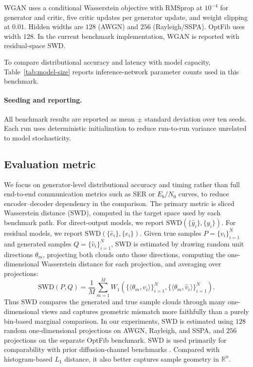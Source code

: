 \documentclass[conference]{IEEEtran}
\begin{document}
WGAN uses a conditional Wasserstein objective with RMSprop at \(10^{-4}\) for generator and critic, five critic updates per generator update, and weight clipping at \(0.01\). Hidden widths are \(128\) (AWGN) and \(256\) (Rayleigh/SSPA). OptFib uses width \(128\). In the current benchmark implementation, WGAN is reported with residual-space SWD.

To compare distributional accuracy and latency with model capacity, Table~\ref{tab:model-size} reports inference-network parameter counts used in this benchmark.


\paragraph{Seeding and reporting.}
  All benchmark results are reported as mean \(\pm\) standard deviation over ten seeds.
  Each run uses deterministic initialization to reduce run-to-run variance unrelated to model
  stochasticity.

\subsection{Evaluation metric}
We focus on generator-level distributional accuracy and timing rather than full end-to-end communication metrics such as SER or \(E_b/N_0\) curves, to reduce encoder--decoder dependency in the comparison.
The primary metric is sliced Wasserstein distance (SWD), computed in the target space used by each benchmark path.
For direct-output models, we report \(\mathrm{SWD}\!\left(\{\hat{y}_i\}, \{y_i\}\right)\). For residual models, we report \(\mathrm{SWD}\!\left(\{\hat{e}_i\}, \{e_i\}\right)\).
Given true samples \(P=\{v_i\}_{i=1}^N\) and generated samples \(Q=\{\hat v_i\}_{i=1}^N\), SWD is estimated by drawing random unit directions \(\theta_m\), projecting both clouds onto those directions, computing the one-dimensional Wasserstein distance for each projection, and averaging over projections:
\begin{equation*}
\mathrm{SWD}(P,Q)
=
\frac{1}{M}
\sum_{m=1}^M
W_1\!\left(\{\langle \theta_m,v_i\rangle\}_{i=1}^N,\{\langle \theta_m,\hat v_i\rangle\}_{i=1}^N\right).
\end{equation*}
Thus SWD compares the generated and true sample clouds through many one-dimensional views and captures geometric mismatch more faithfully than a purely bin-based marginal comparison. In our experiments, SWD is estimated using \(128\) random one-dimensional projections on AWGN,
  Rayleigh, and SSPA, and \(256\) projections on the separate OptFib benchmark.
SWD is used primarily for comparability with prior diffusion-channel benchmarks \cite{paper2309,kimicc2024}. Compared with histogram-based \(L_1\) distance, it also better captures sample geometry in \(\mathbb{R}^n\).
\end{document}
